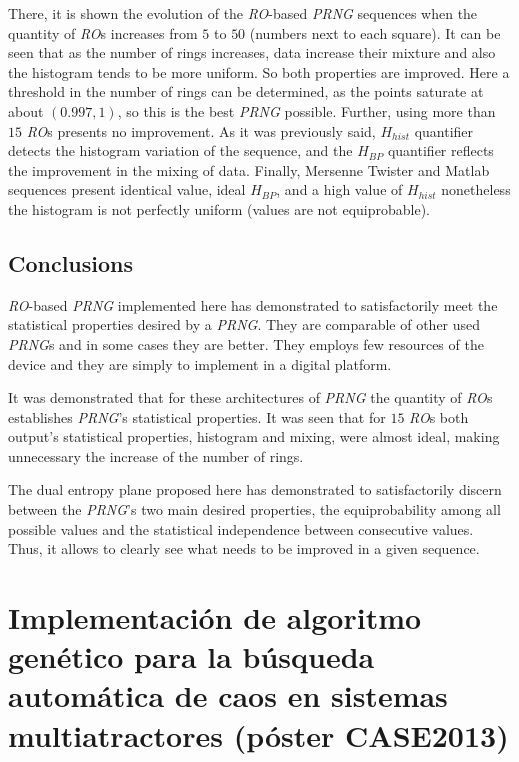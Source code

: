 There, it is shown the evolution of the \emph{RO}-based \emph{PRNG} sequences when the quantity of \emph{RO}s increases from $5$ to $50$ (numbers next to each square). It can be seen that as the number of rings increases, data increase their mixture and also the histogram tends to be more uniform. So both properties are improved. Here a threshold in the number of rings can be determined, as the points saturate at about $(0.997,1)$, so this is the best \emph{PRNG} possible. Further, using more than $15$ \emph{RO}s presents no improvement.
As it was previously said, $H_{hist}$ quantifier detects the histogram variation of the sequence, and the $H_{BP}$ quantifier reflects the improvement in the mixing of data.
Finally, Mersenne Twister and Matlab sequences present identical value, ideal $H_{BP}$, and a high value of $H_{hist}$ nonetheless the histogram is not perfectly uniform (values are not equiprobable).

\subsection{Conclusions}
\label{sec:conclusions}
\emph{RO}-based \emph{PRNG} implemented here has demonstrated to satisfactorily meet the statistical properties desired by a \emph{PRNG}. They are comparable of other used \emph{PRNG}s and in some cases they are better. They employs few resources of the device and they are simply to implement in a digital platform.

It was demonstrated that for these architectures of \emph{PRNG} the quantity of
\emph{RO}s establishes \emph{PRNG}'s statistical properties. It was seen that
for $15$ \emph{RO}s both output's statistical properties, histogram
and mixing, were almost ideal, making unnecessary the increase of the number of rings.

The dual entropy plane proposed here has demonstrated to satisfactorily discern between the \emph{PRNG}'s two main desired properties, the equiprobability among all possible values and the statistical independence between consecutive values. Thus, it allows to clearly see what needs to be improved in a given sequence.



%



\section{Implementación de algoritmo genético para la búsqueda automática de caos en sistemas multiatractores (póster CASE2013)}

